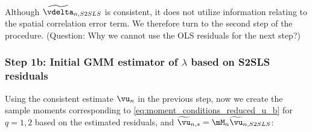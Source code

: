 \documentclass[english,12pt]{book}\usepackage[]{graphicx}\usepackage[]{xcolor}
\begin{document}
Although $\widetilde{\vdelta}_{n, S2SLS}$ is consistent, it does not utilize information relating to the spatial correlation error term. We therefore turn to the second step of the procedure. (Question: Why we cannot use the OLS residuals for the next step?)


\subsubsection{Step 1b: Initial GMM estimator of $\lambda$ based on S2SLS residuals}

Using the consistent estimate $\vu_n$ in the previous step, now we create the sample moments  corresponding to \eqref{eq:moment_conditions_reduced_u_b} for $q= 1, 2$ based on the estimated residuals, and $\widetilde{\vu}_{n,s} = \mM_n\widetilde{\vu}_{n, S2SLS}$:
\end{document}
